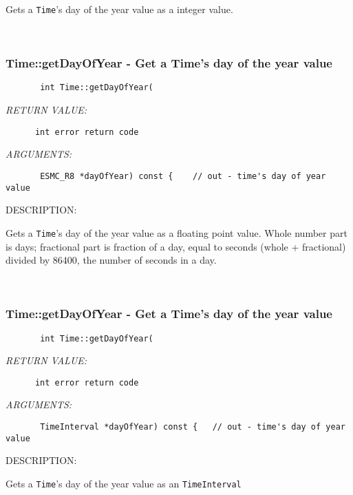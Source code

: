         Gets a {\tt Time}'s day of the year value as a integer value.
   
 
\mbox{}\hrulefill\ 
 
\subsubsection [Time::getDayOfYear] {Time::getDayOfYear - Get a Time's day of the year value}


  
\begin{verbatim}       int Time::getDayOfYear(\end{verbatim}{\em RETURN VALUE:}
\begin{verbatim}      int error return code\end{verbatim}{\em ARGUMENTS:}
\begin{verbatim}       ESMC_R8 *dayOfYear) const {    // out - time's day of year value\end{verbatim}
{\sf DESCRIPTION:\\ }


        Gets a {\tt Time}'s day of the year value as a floating point value.
        Whole number part is days; fractional part is fraction of a day, equal
        to seconds (whole + fractional) divided by 86400, the number of seconds
        in a day.
   
 
\mbox{}\hrulefill\ 
 
\subsubsection [Time::getDayOfYear] {Time::getDayOfYear - Get a Time's day of the year value}


  
\begin{verbatim}       int Time::getDayOfYear(\end{verbatim}{\em RETURN VALUE:}
\begin{verbatim}      int error return code\end{verbatim}{\em ARGUMENTS:}
\begin{verbatim}       TimeInterval *dayOfYear) const {   // out - time's day of year value\end{verbatim}
{\sf DESCRIPTION:\\ }


        Gets a {\tt Time}'s day of the year value as an {\tt TimeInterval}
  
\setlength{\parskip}{\oldparskip}
\setlength{\parindent}{\oldparindent}
\setlength{\baselineskip}{\oldbaselineskip}
